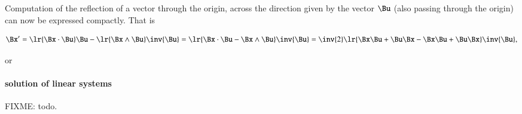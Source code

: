 Computation of the reflection of a vector through the origin, across the direction given by the vector \( \Bu \) (also passing through the origin) can now be expressed compactly.  That is

\begin{dmath}\label{eqn:SimpleProducts2:900}
\Bx'
= \lr{ \Bx \cdot \Bu }\Bu - \lr{ \Bx \wedge \Bu } \inv{\Bu }
= \lr{ \Bx \cdot \Bu - \Bx \wedge \Bu } \inv{\Bu }
= \inv{2} \lr{ \Bx \Bu + \Bu \Bx - \Bx \Bu + \Bu \Bx } \inv{\Bu },
\end{dmath}

or

\paragraph{solution of linear systems}

FIXME: todo.
